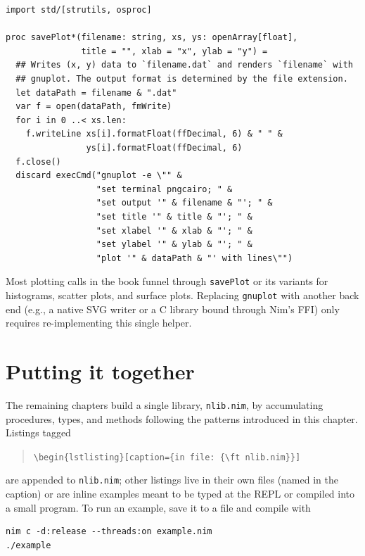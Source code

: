 \documentclass[justified, sixbynine]{tufte-book}
\def\ft{\small\tt}
\theoremstyle{plain}%
\newtheorem * {corollary}{Corollary}
\theoremstyle{definition}
\theoremstyle{remark}
\newtheorem * {remark}{Remark}
\newtheorem * {note}{Note}
\begin{document}
\begin{fullwidth}
\begin{lstlisting}[caption={in file: {\ft nlib.nim}}]
import std/[strutils, osproc]

proc savePlot*(filename: string, xs, ys: openArray[float],
               title = "", xlab = "x", ylab = "y") =
  ## Writes (x, y) data to `filename.dat` and renders `filename` with
  ## gnuplot. The output format is determined by the file extension.
  let dataPath = filename & ".dat"
  var f = open(dataPath, fmWrite)
  for i in 0 ..< xs.len:
    f.writeLine xs[i].formatFloat(ffDecimal, 6) & " " &
                ys[i].formatFloat(ffDecimal, 6)
  f.close()
  discard execCmd("gnuplot -e \"" &
                  "set terminal pngcairo; " &
                  "set output '" & filename & "'; " &
                  "set title '" & title & "'; " &
                  "set xlabel '" & xlab & "'; " &
                  "set ylabel '" & ylab & "'; " &
                  "plot '" & dataPath & "' with lines\"")
\end{lstlisting}

Most plotting calls in the book funnel through {\ft savePlot} or its variants for histograms, scatter plots, and surface plots. Replacing {\ft gnuplot} with another back end (e.g., a native SVG writer or a C library bound through Nim's FFI) only requires re-implementing this single helper.

\goodbreak\section{Putting it together}

The remaining chapters build a single library, {\ft nlib.nim}, by accumulating procedures, types, and methods following the patterns introduced in this chapter. Listings tagged

\begin{quote}
{\ft \textbackslash begin\{lstlisting\}[caption=\{in file: \{\textbackslash ft nlib.nim\}\}]}
\end{quote}

are appended to {\ft nlib.nim}; other listings live in their own files (named in the caption) or are inline examples meant to be typed at the REPL or compiled into a small program. To run an example, save it to a file and compile with

\begin{lstlisting}
nim c -d:release --threads:on example.nim
./example
\end{lstlisting}


\end{fullwidth}
\end{document}
